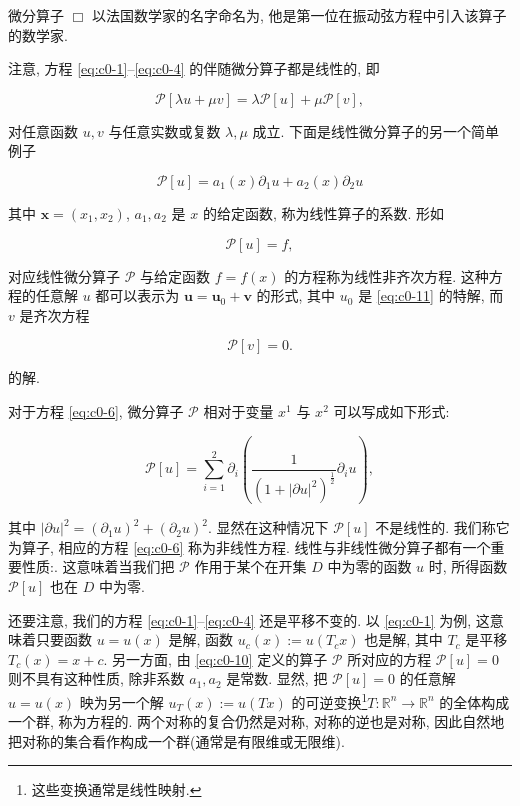 微分算子 $\Box$ 以法国数学家的名字命名为, 他是第一位在振动弦方程中引入该算子的数学家.

注意, 方程 \eqref{eq:c0-1}--\eqref{eq:c0-4} 的伴随微分算子都是线性的, 即

\[
\mathcal{P}[\lambda u + \mu v] = \lambda \mathcal{P}[u] + \mu \mathcal{P}[v],
\]

对任意函数 $u, v$ 与任意实数或复数 $\lambda, \mu$ 成立.
下面是线性微分算子的另一个简单例子

\begin{equation}\label{eq:c0-10}
\mathcal{P}[u] = a_{1}(x) \partial_{1} u + a_{2}(x) \partial_{2} u
\end{equation}

其中 $\boldsymbol{x} = (x_{1}, x_{2})$, $a_{1}, a_{2}$ 是 $x$ 的给定函数, 称为线性算子的系数.
形如

\begin{equation}\label{eq:c0-11}
\mathcal{P}[u] = f,
\end{equation}

对应线性微分算子 $\mathcal{P}$ 与给定函数 $f = f(x)$ 的方程称为线性非齐次方程.
这种方程的任意解 $u$ 都可以表示为 $\boldsymbol{u} = \boldsymbol{u}_{0} + \boldsymbol{v}$ 的形式, 其中 $u_{0}$ 是 \eqref{eq:c0-11} 的特解, 而 $v$ 是齐次方程

\begin{equation}\label{eq:c0-12}
\mathcal{P}[v] = 0.
\end{equation}

的解.

对于方程 \eqref{eq:c0-6}, 微分算子 $\mathcal{P}$ 相对于变量 $x^{1}$ 与 $x^{2}$ 可以写成如下形式:

\[
\mathcal{P}[u] = \sum_{i = 1}^{2} \partial_{i}\left(\frac{1}{(1 + |\partial u|^{2})^{\frac{1}{2}}} \partial_{i} u\right),
\]

其中 $|\partial u|^{2} = (\partial_{1} u)^{2} + (\partial_{2} u)^{2}$.
显然在这种情况下 $\mathcal{P}[u]$ 不是线性的.
我们称它为算子, 相应的方程 \eqref{eq:c0-6} 称为非线性方程.
线性与非线性微分算子都有一个重要性质:.
这意味着当我们把 $\mathcal{P}$ 作用于某个在开集 $D$ 中为零的函数 $u$ 时, 所得函数 $\mathcal{P}[u]$ 也在 $D$ 中为零.

还要注意, 我们的方程 \eqref{eq:c0-1}--\eqref{eq:c0-4} 还是平移不变的.
以 \eqref{eq:c0-1} 为例, 这意味着只要函数 $u = u(x)$ 是解, 函数 $u_{c}(x) := u(T_{c} x)$ 也是解, 其中 $T_{c}$ 是平移 $T_{c}(x) = x + c$.
另一方面, 由 \eqref{eq:c0-10} 定义的算子 $\mathcal{P}$ 所对应的方程 $\mathcal{P}[u] = 0$ 则不具有这种性质, 除非系数 $a_{1}, a_{2}$ 是常数.
显然, 把 $\mathcal{P}[u] = 0$ 的任意解 $u = u(x)$ 映为另一个解 $u_{T}(x) := u(T x)$ 的可逆变换\footnote{这些变换通常是线性映射.}$T : \mathbb{R}^{n} \to \mathbb{R}^{n}$ 的全体构成一个群, 称为方程的.
两个对称的复合仍然是对称, 对称的逆也是对称, 因此自然地把对称的集合看作构成一个群(通常是有限维或无限维).

